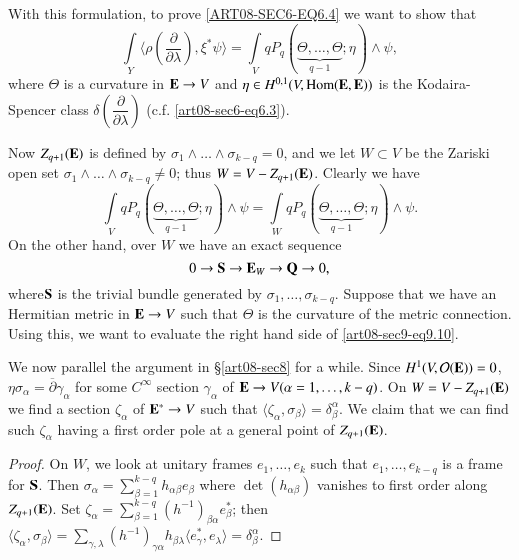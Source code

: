 With this formulation, to prove \eqref{ART08-SEC6-EQ6.4} we want to show that
\begin{equation}
\int\limits_{Y}\langle \rho\left(\dfrac{\partial}{\partial\lambda}\right),\xi^{*}\psi\rangle =\int\limits_{V}qP_{q}(\underbrace{\Theta,\ldots,\Theta}_{q-1};\eta)\wedge \psi,\label{art08-sec9-eq9.9}
\end{equation}
where $\Theta$ is a curvature in $\mathbf{E}\to V$ and $\eta\in H^{0,1}(V,\operatorname{\mathrm{Hom}}(\mathbf{E},\mathbf{E}))$ is the Kodaira-Spencer class $\delta\left(\dfrac{\partial}{\partial\lambda}\right)$ (c.f. \eqref{art08-sec6-eq6.3}).

Now $Z_{q+1}(\mathbf{E})$ is defined by $\sigma_{1}\wedge\ldots\wedge \sigma_{k-q}=0$, and we let $W\subset V$ be the Zariski open set $\sigma_{1}\wedge\ldots\wedge \sigma_{k-q}\neq 0$; thus $W=V-Z_{q+1}(\mathbf{E})$. Clearly we have
\begin{equation}
\int\limits_{V}qP_{q}(\underbrace{\Theta,\ldots,\Theta}_{q-1};\eta)\wedge \psi=\int\limits_{W}qP_{q}(\underbrace{\Theta,\ldots,\Theta}_{q-1};\eta)\wedge\psi.\label{art08-sec9-eq9.10}
\end{equation}
On the other hand, over $W$ we have an exact sequence 
\begin{equation}
0\to \mathbf{S}\to \mathbf{E}_{W}\to \mathbf{Q}\to 0,\label{art08-sec9-eq9.11}
\end{equation}
where\pageoriginale $\mathbf{S}$ is the trivial bundle generated by $\sigma_{1},\ldots,\sigma_{k-q}$. Suppose that we have an Hermitian metric in $\mathbf{E}\to V$ such that $\Theta$ is the curvature of the metric connection. Using this, we want to evaluate the right hand side of \eqref{art08-sec9-eq9.10}.

We now parallel the argument in \S\ref{art08-sec8} for a while. Since $H^{1}(V,\mathcal{O}(\mathbf{E}))=0$, $\eta\sigma_{\alpha}=\overline{\partial}\gamma_{\alpha}$ for some $C^{\infty}$ section $\gamma_{\alpha}$ of $\mathbf{E}\to V(\alpha=1,\ldots,k-q)$. On $W=V-Z_{q+1}(\mathbf{E})$ we find a section $\zeta_{\alpha}$ of $\mathbf{E}^{*}\to V$ such that $\langle \zeta_{\alpha},\sigma_{\beta}\rangle=\delta^{\alpha}_{\beta}$. We claim that we can find such $\zeta_{\alpha}$ having a first order pole at a general point of $Z_{q+1}(\mathbf{E})$.

\begin{proof}
On $W$, we look at unitary frames $e_{1},\ldots,e_{k}$ such that $e_{1},\ldots,e_{k-q}$ is a frame for $\mathbf{S}$. Then $\sigma_{\alpha}=\sum\limits^{k-q}_{\beta=1}h_{\alpha\beta}e_{\beta}$ where $\det (h_{\alpha\beta})$ vanishes to first order along $Z_{q+1}(\mathbf{E})$. Set $\zeta_{\alpha}=\sum\limits^{k-q}_{\beta=1}(h^{-1})_{\beta\alpha}e^{*}_{\beta}$; then $\langle \zeta_{\alpha},\sigma_{\beta}\rangle =\sum\limits_{\gamma,\lambda}(h^{-1})_{\gamma\alpha}h_{\beta\lambda}\langle e^{*}_{\gamma},e_{\lambda}\rangle=\delta^{\alpha}_{\beta}$.
\end{proof}

